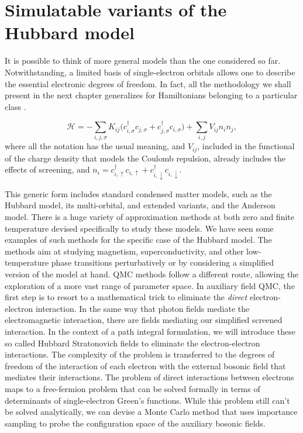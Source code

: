 \section{Simulatable variants of the Hubbard model}\label{sec:variants}

It is possible to think of more general  models than the one considered so far.
Notwithstanding, a limited basis of single-electron orbitals allows one to describe the essential electronic degrees of freedom.
In fact, all the methodology we shall present in the next chapter generalizes for Hamiltonians belonging to a particular class \cite{hanke_electronic_nodate}.

\begin{equation}\label{eq:variantsForm}
\mathcal{H} = - \sum_{i, j, \sigma} K_{ij} \bigg( c_{i, \sigma}^\dagger c_{j, \sigma} + c_{j, \sigma}^\dagger c_{i, \sigma} \bigg) + \sum_{i, j} V_{ij} n_i n_j ,
\end{equation}
where all the notation has the usual meaning, and $V_{ij}$, included in the functional of the charge density that models the Coulomb repulsion, already includes the effects of screening, and $n_i = c_{i,\uparrow}^\dagger c_{i,\uparrow} + c_{i,\downarrow}^\dagger c_{i,\downarrow}$.

This generic form includes standard condensed matter models, such as the Hubbard model, its multi-orbital, and extended variants, and the Anderson model.
There is a huge variety of approximation methods at both zero and finite temperature devised specifically to study these models.
We have seen some examples of such methods for the specific case of the Hubbard model.
The methods aim at studying magnetism, superconductivity, and other low-temperature phase transitions perturbatively or by considering a  simplified version of the model at hand.
\ac{QMC} methods follow a different route, allowing the exploration of a more vast range of parameter space.
In auxiliary field \ac{QMC}, the first step is to resort to a mathematical trick to eliminate the \emph{direct} electron-electron interaction.
In the same way that photon fields mediate the electromagnetic interaction, there are fields mediating our simplified screened interaction.
In the context of a path integral formulation, we will introduce these so called Hubbard Stratonovich fields to eliminate the electron-electron interactions.
The complexity of the problem is transferred to the degrees of freedom of the interaction of each electron with the external bosonic field that mediates their interactions.
The problem of direct interactions between electrons maps to a free-fermion problem that can be solved formally in terms of determinants of single-electron Green's functions.
While this problem still can't be solved analytically, we can devise a Monte Carlo method that uses importance sampling to probe the configuration space of the auxiliary bosonic fields.

